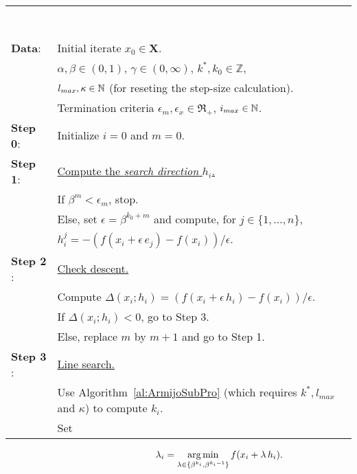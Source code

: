 \noindent
\begin{minipage}[b]{\textwidth}
\begin{algorithm}
~\\
{\em
\begin{tabularx}{\headwidth}{m{2cm}l}
\multicolumn{2}{l}{\hspace{\textwidth}~} \\ \\[-8ex]\\
\hline \\[-2ex]
 \textbf{Data}:
     & Initial iterate $x_0 \in \mathbf X$.\\ 
     & $\alpha, \beta \in (0, 1)$, $\gamma \in (0, \infty)$, $k^*, k_0 \in \mathbb Z$,\\
     & $l_{max}, \kappa \in {\mathbb N}$ (for reseting the step-size calculation).\\
     & Termination criteria $\epsilon_m, \epsilon_x \in \Re_+$, 
     $i_{max} \in {\mathbb N}$.\\
  \textbf{Step 0}: 
     & Initialize $i=0$ and $m = 0$.\\
  \textbf{Step 1}:
     & \underline{Compute the {\it search direction} $h_i$.}\\
     & If $\beta^m < \epsilon_m$, stop.\\
     & Else, set $\epsilon = \beta^{k_0 + m }$ and compute, for $j \in \{1, \ldots, n\}$,\\
     & $h_i^j = - \left({f(x_i + \epsilon \, e_j ) - f(x_i)}\right)/{\epsilon}$.\\
\textbf{Step 2} : 
     & \underline{Check descent.} \\
     & Compute $\Delta(x_i; h_i) = 
     \left( f(x_i + \epsilon \, h_i ) - f(x_i) \right) / \epsilon$.\\
     & If $\Delta(x_i; h_i) < 0$, go to Step 3.\\
     & Else, replace $m$ by $m+1$ and go to Step 1.\\
\textbf{Step 3} :
     & \underline{Line search.}\\
     & Use Algorithm~\ref{al:ArmijoSubPro} (which requires $k^*, l_{max}$ and $\kappa$) 
     to compute $k_i$.\\
     & Set 
\end{tabularx}
\vspace{-1ex}
 \begin{equation}
   \hspace{3cm} \lambda_i = \argmin_{\lambda \in \{\beta^{k_i}, \beta^{k_i-1} \}  } 
     f(x_i + \lambda \, h_i).

\end{equation}}
\end{algorithm}
\end{minipage}
